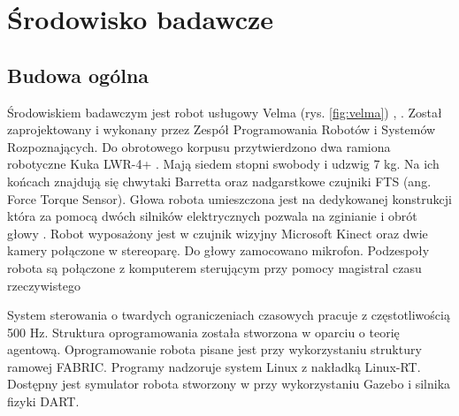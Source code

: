 
\chapter{Środowisko badawcze\label{chap:srodowisko}}
	\section{Budowa ogólna}
	Środowiskiem badawczym jest robot usługowy Velma (rys. \ref{fig:velma}) \cite{bib:velma}, \cite{velma}. Został zaprojektowany i wykonany przez Zespół Programowania Robotów i Systemów Rozpoznających\cite{bib:robotyka}. Do obrotowego korpusu przytwierdzono dwa ramiona robotyczne Kuka LWR-4+\cite{bib:kukaPage} \cite{bib:kuka}. Mają siedem stopni swobody i udzwig 7 kg. Na ich końcach znajdują się chwytaki Barretta\cite{bib:barrett}  oraz nadgarstkowe czujniki FTS (ang. Force Torque Sensor). Głowa robota umieszczona jest na dedykowanej konstrukcji która za pomocą dwóch silników elektrycznych pozwala na zginianie i obrót głowy\cite{bib:velmaLeb} \cite{bib:velmaKorp}. Robot wyposażony jest w czujnik wizyjny Microsoft Kinect oraz dwie kamery połączone w stereoparę. Do głowy zamocowano mikrofon. Podzespoły robota są połączone z komputerem sterującym przy pomocy magistral czasu rzeczywistego
	
	System sterowania o twardych ograniczeniach czasowych pracuje z częstotliwością 500 Hz. Struktura oprogramowania została stworzona w oparciu o teorię agentową. Oprogramowanie robota pisane jest przy wykorzystaniu struktury ramowej FABRIC. Programy nadzoruje system Linux z nakładką Linux-RT. Dostępny jest symulator robota stworzony w przy wykorzystaniu Gazebo i silnika fizyki DART. 
	
